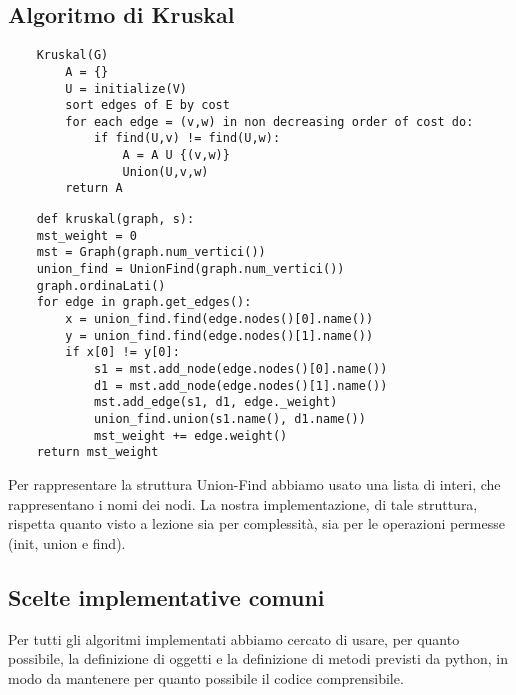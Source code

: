 \clearpage

\subsection{Algoritmo di Kruskal\label{sec:kruskal}}
\begin{verbatim}
    Kruskal(G)
        A = {}
        U = initialize(V)
        sort edges of E by cost
        for each edge = (v,w) in non decreasing order of cost do:
            if find(U,v) != find(U,w):
                A = A U {(v,w)}
                Union(U,v,w)
        return A
\end{verbatim}

\begin{verbatim}
    def kruskal(graph, s):
    mst_weight = 0
    mst = Graph(graph.num_vertici())
    union_find = UnionFind(graph.num_vertici())
    graph.ordinaLati()
    for edge in graph.get_edges():
        x = union_find.find(edge.nodes()[0].name())
        y = union_find.find(edge.nodes()[1].name())
        if x[0] != y[0]:
            s1 = mst.add_node(edge.nodes()[0].name())
            d1 = mst.add_node(edge.nodes()[1].name())
            mst.add_edge(s1, d1, edge._weight)
            union_find.union(s1.name(), d1.name())
            mst_weight += edge.weight()    
    return mst_weight
\end{verbatim}

Per rappresentare la struttura Union-Find abbiamo usato una lista di interi, che rappresentano i nomi dei nodi.
La nostra implementazione, di tale struttura, rispetta quanto visto a lezione sia per complessità, sia per le operazioni permesse (init, union e find).

\subsection{Scelte implementative comuni\label{sec:comuni}}
Per tutti gli algoritmi implementati abbiamo cercato di usare, per quanto possibile, la definizione di oggetti e la definizione di metodi previsti da python, in modo da mantenere per quanto possibile il codice comprensibile.